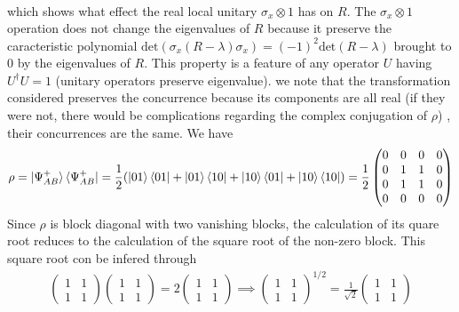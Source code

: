 \documentclass[10pt, a4paper]{article}
\begin{document}
{\begin{enumerate}
{\begin{align*}
  \end{align*}
  which shows what effect the real local unitary $\sigma_x \otimes 1$ has on $R$. The $\sigma_x \otimes 1$ operation does not change the eigenvalues of $R$ because it preserve the caracteristic polynomial $\text{det}(\sigma_x (R - \lambda)\sigma_x) = (-1)^2 \text{det}(R - \lambda)$ brought to $0$ by the eigenvalues of $R$. This property is a feature of any operator $U$ having $U^\dagger U = 1$ (unitary operators preserve eigenvalue). we note that the transformation considered preserves the concurrence because its components are all real (if they were not, there would be complications regarding the complex conjugation of $\rho$)}
  , their concurrences are the same. We have 
  \begin{align*}
    \rho = \ket{\Psi^{+}_{AB}} \bra{\Psi^{+}_{AB}} = \frac{1}{2}(\ket{01}\bra{01} + \ket{01}\bra{10}  + \ket{10}\bra{01} + \ket{10}\bra{10}) = \frac{1}{2}
    \begin{pmatrix}
      0 & 0 & 0 & 0\\
      0 & 1 & 1 & 0\\
      0 & 1 & 1 & 0\\
      0 & 0 & 0 & 0
    \end{pmatrix}
  \end{align*}
  Since $\rho$ is block diagonal with two vanishing blocks, the calculation of its quare root reduces to the calculation of the square root of the non-zero block. This square root con be infered through 
  \begin{align*} 
    \begin{pmatrix}
      1 & 1\\
      1 & 1
    \end{pmatrix}
    \begin{pmatrix}
      1 & 1\\
      1 & 1
    \end{pmatrix}
    = 2
    \begin{pmatrix}
      1 & 1\\
      1 & 1
    \end{pmatrix} \implies \begin{pmatrix}
      1 & 1\\
      1 & 1
    \end{pmatrix}^{1/2} = \frac{1}{\sqrt{2}}\begin{pmatrix}
      1 & 1\\
      1 & 1
    \end{pmatrix}
  \end{align*}

\end{enumerate}}
\end{document}
